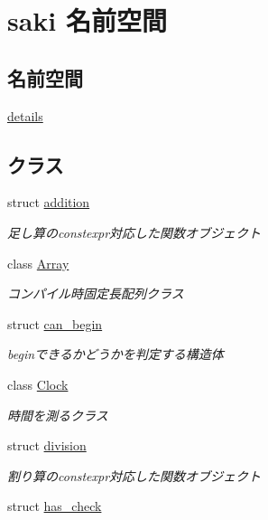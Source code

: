 \hypertarget{namespacesaki}{}\section{saki 名前空間}
\label{namespacesaki}
\subsection*{名前空間}
\begin{DoxyCompactItemize}
\item 
 \mbox{\hyperlink{namespacesaki_1_1details}{details}}
\end{DoxyCompactItemize}
\subsection*{クラス}
\begin{DoxyCompactItemize}
\item 
struct \mbox{\hyperlink{structsaki_1_1addition}{addition}}
\begin{DoxyCompactList}\small\item\em 足し算のconstexpr対応した関数オブジェクト \end{DoxyCompactList}\item 
class \mbox{\hyperlink{classsaki_1_1_array}{Array}}
\begin{DoxyCompactList}\small\item\em コンパイル時固定長配列クラス \end{DoxyCompactList}\item 
struct \mbox{\hyperlink{structsaki_1_1can__begin}{can\+\_\+begin}}
\begin{DoxyCompactList}\small\item\em beginできるかどうかを判定する構造体 \end{DoxyCompactList}\item 
class \mbox{\hyperlink{classsaki_1_1_clock}{Clock}}
\begin{DoxyCompactList}\small\item\em 時間を測るクラス \end{DoxyCompactList}\item 
struct \mbox{\hyperlink{structsaki_1_1division}{division}}
\begin{DoxyCompactList}\small\item\em 割り算のconstexpr対応した関数オブジェクト \end{DoxyCompactList}\item 
struct \mbox{\hyperlink{structsaki_1_1has__check}{has\+\_\+check}}

\end{DoxyCompactItemize}
